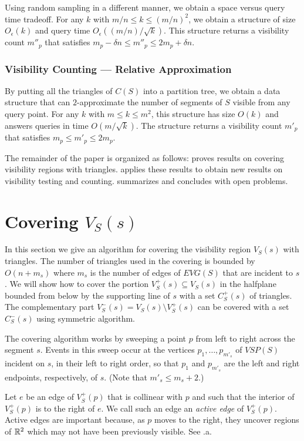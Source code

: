 \documentclass{patmorin}
\newcommand{\EVG}{\mathit{EVG}}
\newcommand{\VSP}{\mathit{VSP}}
\newcommand{\Oe}{O_\epsilon}
\begin{document}
Using random sampling in a different manner, we obtain a space versus query
time tradeoff. For any $k$ with $m/n \le k \le (m/n)^2$, we obtain a
structure of size $\Oe(k)$ and query time $\Oe((m/n)/\sqrt{k})$.  This
structure returns a visibility count $m''_p$ that satisfies $m_p-\delta n
\le m''_p \le 2m_p + \delta n$.  

\subsubsection{Visibility Counting --- Relative Approximation} 

By putting all the triangles of $C(S)$ into a partition tree, we obtain
a data structure that can $2$-approximate the number of segments of $S$
visible from any query point.  For any $k$ with $m\le k\le m^2$, this
structure has size $O(k)$ and answers queries in time $O(m/\sqrt{k})$.  The
structure returns a visibility count $m'_p$ that satisfies $m_p \le m'_p\le
2m_p$.

The remainder of the paper is organized as follows:  
proves results on covering visibility regions with triangles.
 applies these results to obtain new results on
visibility testing and counting.  summarizes and
concludes with open problems.

\section{Covering $V_S(s)$}

In this section we give an algorithm for covering the visibility region
$V_S(s)$ with triangles.  The number of triangles used in the covering is
bounded by $O(n+m_s)$ where $m_s$ is the number of edges of $\EVG(S)$ that
are incident to $s$.  We will show how to cover the portion
$V^+_S(s)\subseteq V_S(s)$ in the halfplane bounded from below by the
supporting line of $s$ with a set $C^+_S(s)$ of triangles.  The
complementary part $V^-_S(s)=V_S(s)\setminus V^+_S(s)$ can be covered with
a set $C^-_S(s)$ using symmetric algorithm.

The covering algorithm works by sweeping a point $p$ from left to right
across the segment $s$.  Events in this sweep occur at the vertices
$p_1,\ldots,p_{m'_s}$ of $\VSP(S)$ incident on $s$, in their left to right
order, so that $p_1$ and $p_{m'_s}$ are the left and right endpoints,
respectively, of $s$.  (Note that $m'_s \le m_s + 2$.)

Let $e$ be an edge of $V^+_S(p)$ that is collinear with $p$ and such that the
interior of $V^+_S(p)$ is to the right of $e$. We call such an edge an
\emph{active edge} of $V^+_S(p)$.  Active edges are important because, as $p$
moves to the right, they uncover regions of $\mathbb{R}^2$ which may not have been
previously visible.  See .a.
\end{document}

